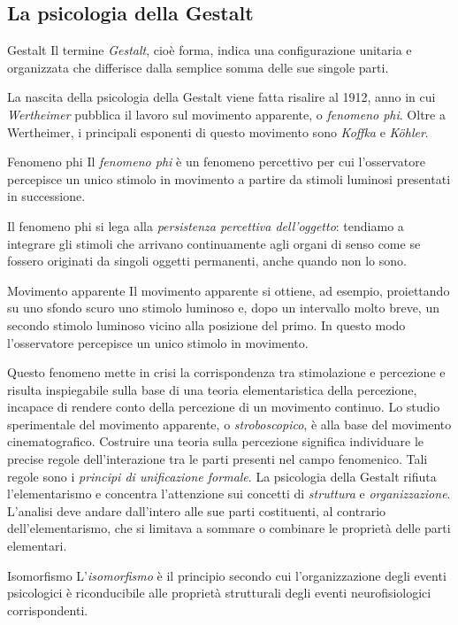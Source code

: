 \documentclass[a4paper]{article}
\begin{document}
\subsection{La psicologia della Gestalt}
\begin{snippetdefinition}{Gestalt}
    Il termine \emph{Gestalt}, cioè forma, indica una configurazione unitaria e organizzata che differisce dalla semplice somma delle sue singole parti.
\end{snippetdefinition}
La nascita della psicologia della Gestalt viene fatta risalire al 1912, anno in cui \emph{Wertheimer} pubblica il lavoro sul movimento apparente, o \emph{fenomeno phi}. Oltre a Wertheimer, i principali esponenti di questo movimento sono \emph{Koffka} e \emph{Köhler}.
\begin{snippetdefinition}{Fenomeno phi}
    Il \emph{fenomeno phi} è un fenomeno percettivo per cui l'osservatore percepisce un unico stimolo in movimento a partire da stimoli luminosi presentati in successione.
\end{snippetdefinition}
Il fenomeno phi si lega alla \emph{persistenza percettiva dell'oggetto}: tendiamo a integrare gli stimoli che arrivano continuamente agli organi di senso come se fossero originati da singoli oggetti permanenti, anche quando non lo sono.
\begin{snippetexample}{Movimento apparente}
    Il movimento apparente si ottiene, ad esempio, proiettando su uno sfondo scuro uno stimolo luminoso e, dopo un intervallo molto breve, un secondo stimolo luminoso vicino alla posizione del primo. In questo modo l'osservatore percepisce un unico stimolo in movimento.
\end{snippetexample}
Questo fenomeno mette in crisi la corrispondenza tra stimolazione e percezione e risulta inspiegabile sulla base di una teoria elementaristica della percezione, incapace di rendere conto della percezione di un movimento continuo.
Lo studio sperimentale del movimento apparente, o \emph{stroboscopico}, è alla base del movimento cinematografico.
Costruire una teoria sulla percezione significa individuare le precise regole dell'interazione tra le parti presenti nel campo fenomenico. Tali regole sono i \emph{principi di unificazione formale}.
La psicologia della Gestalt rifiuta l'elementarismo e concentra l'attenzione sui concetti di \emph{struttura} e \emph{organizzazione}. L'analisi deve andare dall'intero alle sue parti costituenti, al contrario dell'elementarismo, che si limitava a sommare o combinare le proprietà delle parti elementari.
\begin{snippetdefinition}{Isomorfismo}
    L'\emph{isomorfismo} è il principio secondo cui l'organizzazione degli eventi psicologici è riconducibile alle proprietà strutturali degli eventi neurofisiologici corrispondenti.
\end{snippetdefinition}
\end{document}
